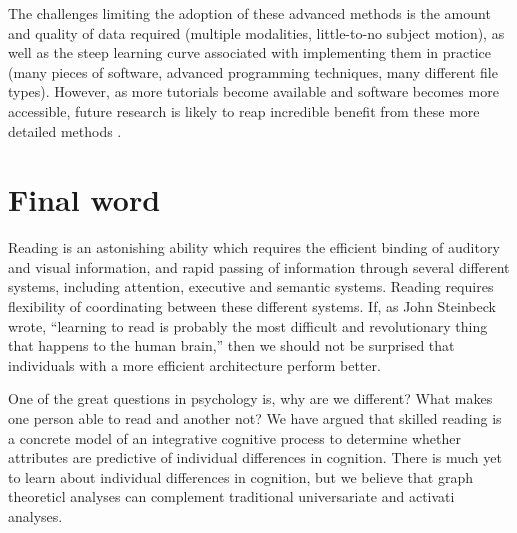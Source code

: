 The challenges limiting the adoption of these advanced methods is the amount and quality of data required (multiple modalities, little-to-no subject motion), as well as the steep learning curve associated with implementing them in practice (many pieces of software, advanced programming techniques, many different file types). However, as more tutorials become available and software becomes more accessible, future research is likely to reap incredible benefit from these more detailed methods \citep{Poldrack2015}.

\section{Final word}

Reading is an astonishing ability which requires the efficient binding of auditory and visual information, and rapid passing of information through several different systems, including attention, executive and semantic systems.  Reading requires flexibility of coordinating between these different systems. If, as John Steinbeck wrote, ``learning to read is probably the most difficult and revolutionary thing that happens to the human brain,'' then we should not be surprised that individuals with a more efficient architecture perform better. 




One of the great questions in psychology is, why are we different? What makes one person able to read and another not? We have argued that skilled reading is a concrete model of an integrative cognitive process to determine whether attributes are predictive of individual differences in cognition. There is much yet to learn about individual differences in cognition, but we believe that graph theoreticl analyses can complement traditional universariate and activati analyses. 